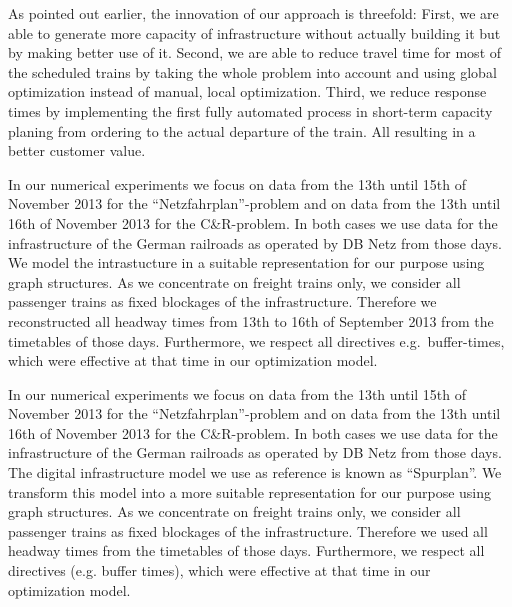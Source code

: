 As pointed out earlier, the innovation of our approach is threefold: First, we are able to generate more capacity of infrastructure without actually building it but by making better use of it. Second, we are able to reduce travel time for most of the scheduled trains by taking the whole problem into account and using global optimization instead of manual, local optimization. Third, we reduce response times by implementing the first fully automated process in short-term capacity planing from ordering to the actual departure of the train. All resulting in a better customer value.

In our numerical experiments we focus on data from the 13th until 15th of November 2013 for the ``Netzfahrplan''-problem and on data from the 13th until 16th of November 2013 for the C\&R-problem. In both cases we use data for the infrastructure of the German railroads as operated by DB Netz from those days. We model the intrastucture in a suitable representation for our purpose using graph structures. As we concentrate on freight trains only, we consider all passenger trains as fixed blockages of the infrastructure. Therefore we reconstructed all headway times from 13th to 16th of September 2013 from the timetables of those days. Furthermore, we respect all directives e.g.\ buffer-times, which were effective at that time in our optimization model.

In our numerical experiments we focus on data from the 13th until 15th of November 2013 for the ``Netzfahrplan''-problem and on data from the 13th until 16th of November 2013 for the C\&R-problem. In both cases we use data for the infrastructure of the German railroads as operated by DB Netz from those days. The digital infrastructure model we use as reference is known as ``Spurplan''. We transform this model into a more suitable representation for our purpose using graph structures. As we concentrate on freight trains only, we consider all passenger trains as fixed blockages of the infrastructure. Therefore we used all headway times from the timetables of those days. Furthermore, we respect all directives (e.g. buffer times), which were effective at that time in our optimization model.

